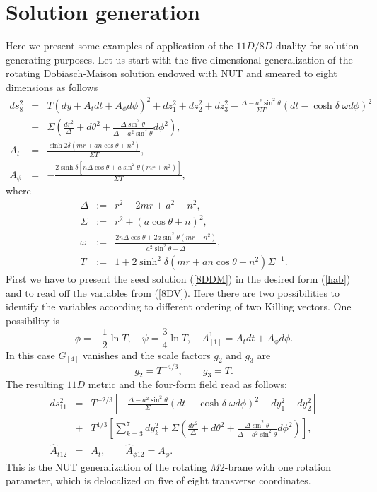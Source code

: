 \documentclass[a4paper,12pt]{article}
\begin{document}
\section{Solution generation} \label{EXAMPLE}
Here we present some examples of application of the $11D/8D$
duality for solution generating purposes. Let us start with the
five-dimensional generalization of the rotating Dobiasch-Maison
solution \cite{ChGaMaSh99} endowed with NUT and smeared to eight
dimensions as follows
\begin{eqnarray}
ds_{8}^2 &=& T \left( dy + A_t dt + A_\phi d\phi \right)^2 +
dz_1^2 + dz_2^2 + dz_3^2 - \frac{\Delta-a^2\sin^2\theta}{\Sigma T}
\left( dt - \cosh\delta \;\omega d\phi \right)^2 \nonumber \\
&+& \Sigma \left( \frac{d r^2}{\Delta} + d\theta^2 +
\frac{\Delta\sin^2\theta}{\Delta-a^2\sin^2\theta}d\phi^2 \right),
\nonumber \\
A_t &=& \frac{\sinh2\delta \left( mr + an\cos\theta + n^2 \right)}
{\Sigma T}, \nonumber \\
A_\phi &=& -\frac{ 2\sinh\delta \left[ n \Delta\cos\theta +
a\sin^2\theta (mr+n^2) \right]}{\Sigma T}, \label{8DDM}
\end{eqnarray}
where
\begin{eqnarray}
\Delta &:=& r^2 - 2mr + a^2 - n^2, \\
\Sigma &:=& r^2 + (a\cos\theta+n)^2, \\
\omega &:=& \frac{2n\Delta\cos\theta + 2a\sin^2\theta(mr+n^2)}
{a^2\sin^2\theta-\Delta}, \\
T &:=& 1 + 2\sinh^2\delta (mr+an\cos\theta+n^2)\Sigma^{-1}.
\end{eqnarray}
First we have to present the seed solution (\ref{8DDM}) in the
desired form (\ref{hab}) and to read off the variables from
(\ref{8DV}). Here there are two possibilities to identify the
variables according to different ordering of two Killing vectors.
One possibility is
\begin{equation}
\phi = -\frac12 \ln T, \quad \psi = \frac34 \ln T, \quad
A_{[1]}^1 = A_t dt + A_\phi d\phi.
\end{equation}
In this case $G_{[4]}$ vanishes and the scale factors $g_2$ and
$g_3$ are
\begin{equation}
g_2 = T^{-4/3}, \qquad g_3 = T.
\end{equation}
The resulting $11D$ metric and the four-form field read as
follows:
\begin{eqnarray}
ds_{11}^2 &=& T^{-2/3} \left[ -
\frac{\Delta-a^2\sin^2\theta}{\Sigma} \left( dt - \cosh\delta
\;\omega d\phi \right)^2 + dy_1^2 + dy_2^2 \right] \nonumber \\
&+& T^{1/3} \left[ \sum_{k=3}^7 dy_k^2 + \Sigma \left( \frac{d
r^2}{\Delta} + d\theta^2 +
\frac{\Delta\sin^2\theta}{\Delta-a^2\sin^2\theta} d\phi^2
\right)\right], \nonumber \\
\hat A_{t12} &=& A_t, \qquad \hat A_{\phi 12} = A_\phi.
\label{2DDM}
\end{eqnarray}
This is the NUT generalization of the rotating $M2$-brane with
one rotation parameter, which is delocalized on five of eight
transverse coordinates.
\end{document}
